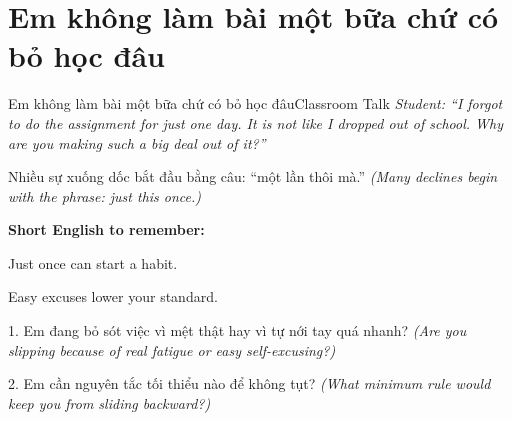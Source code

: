 \section{Em không làm bài một bữa chứ có bỏ học đâu}
\begin{truyen}{Em không làm bài một bữa chứ có bỏ học đâu}{Classroom Talk}
\textit{Student: ``I forgot to do the assignment for just one day. It is not like I dropped out of school. Why are you making such a big deal out of it?''}\\[4pt]



\end{truyen}

\begin{baihoc}
Nhiều sự xuống dốc bắt đầu bằng câu: ``một lần thôi mà.''
\textit{(Many declines begin with the phrase: just this once.)}
\end{baihoc}

\begin{ghinhoanh}
\textbf{Short English to remember:}

Just once can start a habit.

Easy excuses lower your standard.
\end{ghinhoanh}

\begin{tuhocnhanh}
1. Em đang bỏ sót việc vì mệt thật hay vì tự nới tay quá nhanh? \textit{(Are you slipping because of real fatigue or easy self-excusing?)}

2. Em cần nguyên tắc tối thiểu nào để không tụt? \textit{(What minimum rule would keep you from sliding backward?)}
\end{tuhocnhanh}
\ngancach


